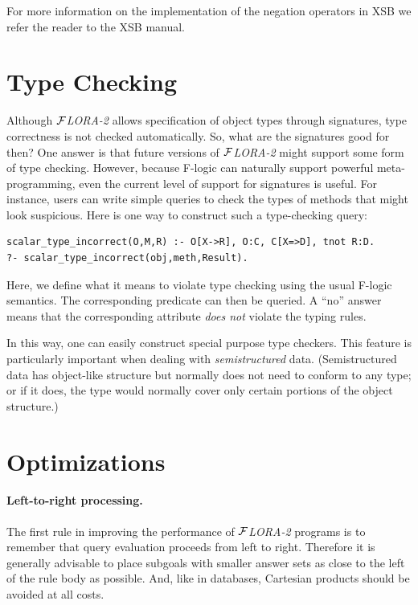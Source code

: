 \documentclass[11pt]{article}
\newcommand{\FLORA}{{\mbox{${\cal F}${\small\it LORA}\rm\emph{-2}}}\xspace}
\newcommand{\fl}{\mbox{F-logic}\xspace}
\begin{document}
For more information on the implementation of the negation operators in XSB
we refer the reader to the XSB manual.




\section{Type Checking}


Although \FLORA allows specification of object types through signatures,
type correctness is not checked automatically. So, what are the
signatures good for then? One answer is that future versions of \FLORA
might support some form of type checking. However, because \fl can
naturally support powerful meta-programming, even the current level
of support for signatures is useful. For instance, users can write
simple queries to check the types of methods that might look suspicious.
Here is one way to construct such a type-checking query:
\begin{verbatim}
scalar_type_incorrect(O,M,R) :- O[X->R], O:C, C[X=>D], tnot R:D.
?- scalar_type_incorrect(obj,meth,Result).
\end{verbatim}
Here, we define what it means to violate type checking using the usual
\fl semantics. The corresponding predicate can then be queried. A
``no'' answer means that the corresponding attribute \emph{does not}
violate the typing rules.

In this way, one can easily construct special purpose type checkers.  This
feature is particularly important when dealing with \emph{semistructured}
data. (Semistructured data has object-like structure but normally does not
need to conform to any type; or if it does, the type would normally cover
only certain portions of the object structure.)


\section{Optimizations}

\paragraph{Left-to-right processing.}
The first rule in improving the performance of \FLORA programs is to
remember that query evaluation proceeds from left to right. Therefore it is
generally advisable to place subgoals with smaller answer sets as close to
the left of the rule body as possible. And, like in databases, Cartesian
products should be avoided at all costs.
\end{document}
